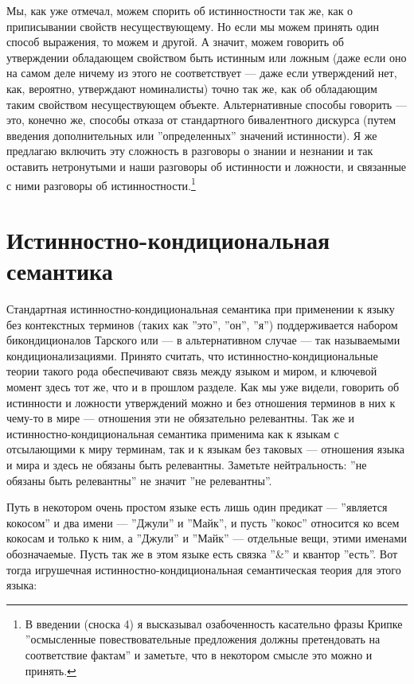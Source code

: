 \documentclass[11pt]{book}
\begin{document}
Мы, как уже отмечал, можем спорить об истинностности так же, как о приписывании свойств несуществующему. Но если мы можем принять один способ выражения, то можем и другой. А значит, можем говорить об утверждении обладающем свойством быть истинным или ложным (даже если оно на самом деле ничему из этого не соответствует --- даже если утверждений нет, как, вероятно, утверждают номиналисты) точно так же, как об обладающим таким свойством несуществующем объекте. Альтернативные способы говорить --- это, конечно же, способы отказа от стандартного бивалентного дискурса (путем введения дополнительных или ''определенных'' значений истинности). Я же предлагаю включить эту сложность в разговоры о знании и незнании и так оставить нетронутыми и наши разговоры об истинности и ложности, и связанные с ними разговоры об истинностности.\footnote{В введении (сноска 4) я высказывал озабоченность касательно фразы Крипке ''осмысленные повествовательные предложения должны претендовать на соответствие фактам'' и заметьте, что в некотором смысле это можно и принять.}

\section{Истинностно-кондициональная семантика}

Стандартная истинностно-кондициональная семантика при применении к языку без контекстных терминов (таких как ''это'', ''он'', ''я'') поддерживается набором бикондиционалов Тарского или --- в альтернативном случае --- так называемыми кондиционализациями. Принято считать, что истинностно-кондициональные теории такого рода обеспечивают связь между языком и миром, и ключевой момент здесь тот же, что и в прошлом разделе. Как мы уже видели, говорить об истинности и ложности утверждений можно и без отношения терминов в них к чему-то в мире --- отношения эти не обязательно релевантны. Так же и истинностно-кондициональная семантика применима как к языкам с отсылающими к миру терминам, так и к языкам без таковых --- отношения языка и мира и здесь не обязаны быть релевантны. Заметьте нейтральность: ''не обязаны быть релевантны'' не значит ''не релевантны''.

Путь в некотором очень простом языке есть лишь один предикат --- ''является кокосом'' и два имени --- ''Джули'' и ''Майк'', и пусть ''кокос'' относится ко всем кокосам и только к ним, а ''Джули'' и ''Майк'' --- отдельные вещи, этими именами обозначаемые. Пусть так же в этом языке есть связка ''\&'' и квантор ''есть''. Вот тогда игрушечная истинностно-кондициональная семантическая теория для этого языка:
\end{document}
